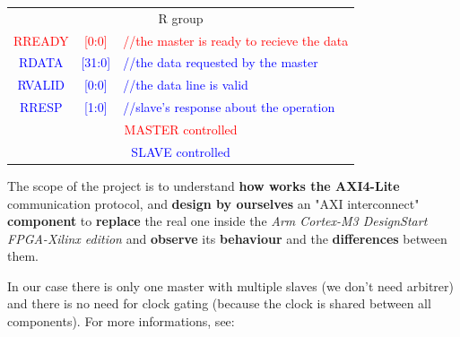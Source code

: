 \begin{tabular} {c c l}
  \multicolumn{3}{c}{{R group}} \\
  \textcolor{Red}{\small{RREADY}} & \textcolor{Red}{\small{[0:0]}} & \textcolor{Red}{\small{//the master is ready to recieve the data}} \\
  \textcolor{Blue}{\small{RDATA}} & \textcolor{Blue}{\small{[31:0]}} & \textcolor{Blue}{\small{//the data requested by the master}} \\
  \textcolor{Blue}{\small{RVALID}} & \textcolor{Blue}{\small{[0:0]}} & \textcolor{Blue}{\small{//the data line is valid}} \\
  \textcolor{Blue}{\small{RRESP}} & \textcolor{Blue}{\small{[1:0]}} & \textcolor{Blue}{\small{//slave’s response about the operation}} \\

  \hline
  \multicolumn{3}{c}{\textcolor{Red}{MASTER controlled}} \\
  \multicolumn{3}{c}{\textcolor{Blue}{SLAVE controlled}} \\
\end{tabular}

\newpage
{}

The scope of the project is to understand {\bf how works the AXI4-Lite} communication protocol, and {\bf design by ourselves} an "AXI interconnect" {\bf component} to {\bf replace} the real one inside the {\it Arm Cortex-M3 DesignStart FPGA-Xilinx edition} and {\bf observe} its {\bf behaviour} and the {\bf differences} between them.

In our case there is only one master with multiple slaves (we don't need arbitrer) and there is no need for clock gating (because the clock is shared between all components).
For more informations, see: \cite{vivadoGuide} \cite{AXISpecification}
\newline
